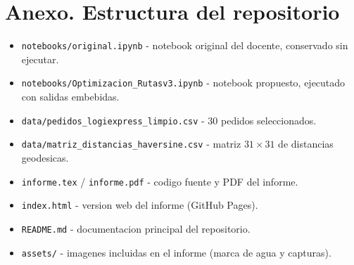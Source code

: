 \documentclass[11pt,a4paper]{article}
\begin{document}
\appendix
\section*{Anexo. Estructura del repositorio}
\begin{itemize}[leftmargin=*,nosep]
  \item \texttt{notebooks/original.ipynb} - notebook original del docente, conservado sin ejecutar.
  \item \texttt{notebooks/Optimizacion\_Rutasv3.ipynb} - notebook propuesto, ejecutado con salidas embebidas.
  \item \texttt{data/pedidos\_logiexpress\_limpio.csv} - 30 pedidos seleccionados.
  \item \texttt{data/matriz\_distancias\_haversine.csv} - matriz $31 \times 31$ de distancias geodesicas.
  \item \texttt{informe.tex} / \texttt{informe.pdf} - codigo fuente y PDF del informe.
  \item \texttt{index.html} - version web del informe (GitHub Pages).
  \item \texttt{README.md} - documentacion principal del repositorio.
  \item \texttt{assets/} - imagenes incluidas en el informe (marca de agua y capturas).
\end{itemize}
\end{document}

